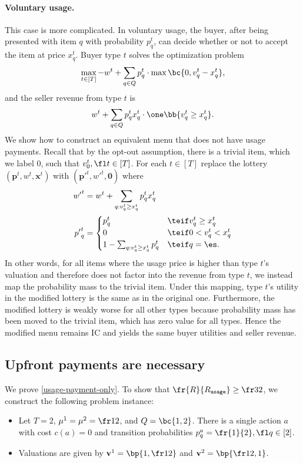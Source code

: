 \paragraph{Voluntary usage.} This case is more complicated. In voluntary usage, the buyer, after being presented with item $q$ with probability $p^t_q$, can decide whether or not to accept the item at price $x^t_q$. Buyer type $t$ solves the optimization problem $$\max_{t\in [T]} -w^t + \sum_{q\in Q} p^t_q \cdot \max\bc{0, v^t_q - x^t_q},$$ and the seller revenue from type $t$ is $$w^t + \sum_{q\in Q} p^t_q x^t_q \cdot \one\bb{v^t_q \ge x^t_q}.$$ We show how to construct an equivalent menu that does not have usage payments. Recall that by the opt-out assumption, there is a trivial item, which we label 0, such that $v^t_0,\fl t\in [T]$. For each $t\in [T]$ replace the lottery $(\mathbf{p}^t, w^t, \mathbf{x}^t)$ with $(\mathbf{p'}^t, {w'}^t, \mathbf{0})$ where
\begin{align*}
        {w'}^t &= w^t + \sum_{q: v^t_q \ge x^t_q} p^t_q x^t_q \\
        {p'}^t_q &= \begin{cases} p^t_q & \teif v^t_q \ge x^t_q \\ 0 & \teif 0 < v^t_q < x^t_q \\ 1 - \sum_{q: v^t_q \ge x^t_q} p^t_q & \teif q = \es.\end{cases}
\end{align*}
In other words, for all items where the usage price is higher than type $t$'s valuation and therefore does not factor into the revenue from type $t$, we instead map the probability mass to the trivial item. Under this mapping, type $t$'s utility in the modified lottery is the same as in the original one. Furthermore, the modified lottery is weakly worse for all other types because probability mass has been moved to the trivial item, which has zero value for all types. Hence the modified menu remains IC and yields the same buyer utilities and seller revenue.

\subsection{Upfront payments are necessary} \label{proof-usage-payment-only}

We prove \cref{usage-payment-only}. To show that $\fr{R}{\Rusage} \ge \fr32$, we construct the following problem instance:
    \begin{itemize}
        \item Let $T = 2$, $\mu^1 = \mu^2 = \fr12$, and $Q = \bc{1, 2}$. There is a single action $a$ with cost $c(a) = 0$ and transition probabilities $p^a_q = \fr{1}{2},\fl q\in [2]$.
        \item Valuations are given by $\mathbf{v}^1 = \bp{1,\fr12}$ and $\mathbf{v}^2 = \bp{\fr12, 1}$.
    \end{itemize}

